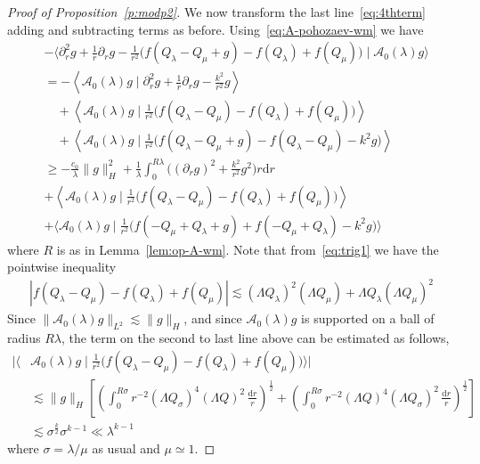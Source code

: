 \documentclass[10pt,reqno]{amsart}
\newcommand{\A}{\mathcal{A}}
\newcommand{\la}{\lambda}
\newcommand{\s}{\sigma}
\newcommand{\La}{\Lambda}
\newcommand{\ang}[1]{\left\langle{#1}\right\rangle}
\newcommand{\abs}[1]{\left\lvert{#1}\right\rvert}
\newcommand{\EQ}[1]{\begin{equation}\begin{split} #1 \end{split}\end{equation}}
\numberwithin{equation}{section}
\theoremstyle{remark}
\newcommand{\ud}{\mathrm{d}}
\newcommand{\0}{\emptyset}
\begin{document}
\begin{proof}[Proof of Proposition~\ref{p:modp2}]
We now transform the last line~\eqref{eq:4thterm} adding and subtracting terms as before. Using~\eqref{eq:A-pohozaev-wm} we have
\begin{equation}
\label{eq:mod-dtb-2nd-line}
\begin{aligned}
&{-} \Big\langle \partial_r^2 g + \frac 1r \partial_r g - \frac{1}{r^2}\big(f(Q_\la- Q_\mu + g) - f(Q_\la) +f(Q_\mu)\big) \mid  \A_0(\lambda)g\Big\rangle \\
& = -\ang{ \A_0(\la) g \mid  \partial_r^2 g + \frac 1r \partial_r g - \frac{k^2}{r^2}g} \\
&\quad + \ang{ \A_0(\la) g \mid \frac{1}{r^2} \Big( f(Q_\la - Q_\mu) - f(Q_\la) + f(Q_\mu) \Big)}\\
& \quad +\ang{ \A_0(\la) g \mid  \frac{1}{r^2} \Big( f(Q_\la - Q_\mu + g) - f(Q_\la-Q_\mu) - k^2 g \Big)} \\
&\geq -\frac{c_0}{\lambda}\|g \|_H^2 + \frac{1}{\lambda}\int_0^{R\lambda}\Big((\partial_r g)^2 + \frac{k^2}{r^2}g^2\Big)r\ud r \\
&+ \ang{ \A_0(\la) g \mid \frac{1}{r^2} \Big( f(Q_\la - Q_\mu) - f(Q_\la) + f(Q_\mu) \Big)}\\
&+ \Big\langle \A_0(\lambda)g \mid 
\frac{1}{r^2}\big(f({-}Q_\mu + Q_\lambda + g) + f(-Q_\mu + Q_\la) - k^2g\big)\Big\rangle
\end{aligned}
\end{equation}
where $R$ is as in Lemma~\ref{lem:op-A-wm}. 
Note that from~\eqref{eq:trig1} we have the pointwise inequality 
\EQ{
\abs{ f(Q_\la - Q_\mu) - f(Q_\la) + f(Q_\mu)} \lesssim (\La Q_\la)^2 (\La Q_\mu) + \La Q_\la (\La Q_{\mu})^2
}
Since $\| \A_0(\la) g \|_{L^2} \lesssim \|g \|_{H}$, and since $\A_0(\la) g$ is supported on a ball of radius $R \la$, the term on the second to last line above can be estimated as follows, 
\EQ{
\bigg| \bigg\langle &\A_0(\la) g \mid \frac{1}{r^2} \Big( f(Q_\la - Q_\mu) - f(Q_\la) + f(Q_\mu) \Big) \bigg \rangle \bigg| \\ & \lesssim \|g \|_H\left[ \left( \int_0^{R \s} r^{-2} (\La Q_\s)^4 (\La Q)^2 \,  \frac{\ud r}{r} \right)^{\frac{1}{2}} +  \left( \int_0^{R \s} r^{-2} (\La Q)^4 (\La Q_\s)^2 \,  \frac{\ud r}{r} \right)^{\frac{1}{2}} \right] \\
&\lesssim \s^{\frac{k}{2}} \s^{k-1} \ll \la^{k-1} 
}
where $\s = \la/ \mu$ as usual and $\mu \simeq 1$. 


\end{proof}
\end{document}
